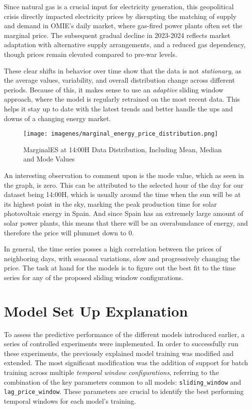 \documentclass[12pt]{report} %
\begin{document}
Since natural gas is a crucial input for electricity generation, this geopolitical crisis directly impacted electricity prices by disrupting the matching of supply and demand in OMIE's daily market, where gas-fired power plants often set the marginal price. The subsequent gradual decline in 2023-2024 reflects market adaptation with alternative supply arrangements, and a reduced gas dependency, though prices remain elevated compared to pre-war levels.

These clear shifts in behavior over time show that the data is not \textit{stationary}, as the average values, variability, and overall distribution change across different periods. Because of this, it makes sense to use an \textit{adaptive} sliding window approach, where the model is regularly retrained on the most recent data. This helps it stay up to date with the latest trends and better handle the ups and downs of a changing energy market.

\begin{figure}[H]
    \centering
    \texttt{[image: imagenes/marginal\_energy\_price\_distribution.png]}
    \label{fig:data_distribution}
    \caption{MarginalES at 14:00H Data Distribution, Including Mean, Median and Mode Values}
\end{figure}

An interesting observation to comment upon is the mode value, which as seen in the graph, is zero. This can be attributed to the selected hour of the day for our dataset being 14:00H, which is usually around the time when the sun will be at its highest point in the sky, marking the peak production time for solar photovoltaic energy in Spain. And since Spain has an extremely large amount of solar power plants, this means that there will be an overabundance of energy, and therefore the price will plummet down to 0.

In general, the time series posses a high correlation between the prices of neighboring days, with seasonal variations, slow and progressively changing the price. The task at hand for the models is to figure out the best fit to the time series for any of the proposed sliding window configurations.


\section{Model Set Up Explanation}

To assess the predictive performance of the different models introduced earlier, a series of controlled experiments were implemented. In order to successfully run these experiments, the previously explained model training was modified and extended. The most significant modification was the addition of support for batch training across multiple \textit{temporal window configurations}, referring to the combination of the key parameters common to all models: \verb|sliding_window| and \verb|lag_price_window|. These parameters are crucial to identify the best performing temporal windows for each model's training.
\end{document}
